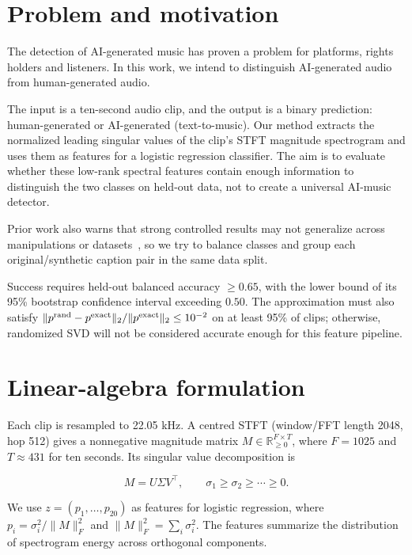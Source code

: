 \documentclass[11pt,a4paper]{article}
\theoremstyle{plain}
\theoremstyle{definition}
\theoremstyle{remark}
\begin{document}
\section{Problem and motivation}
\label{sec:problem}
The detection of AI-generated music has proven a problem
for platforms, rights holders and listeners. In this work,
we intend to distinguish AI-generated audio from human-generated audio.

The input is a ten-second audio clip, and the output is a binary prediction:
human-generated or AI-generated (text-to-music). Our method extracts the
normalized leading singular values of the clip's STFT magnitude spectrogram
and uses them as features for a logistic regression classifier.
The aim is to evaluate whether these low-rank spectral features contain
enough information to distinguish the two classes on held-out data,
not to create a universal AI-music detector.

Prior work also warns that
strong controlled results may not generalize across manipulations
or datasets~\cite{Afchar,LiBench}, so we try to balance classes
and group each original/synthetic caption pair in the same data split.

Success requires held-out balanced accuracy $\geq0.65$, with the lower bound
of its 95\% bootstrap confidence interval exceeding $0.50$.
The approximation must also satisfy
$\|p^{\rm rand}-p^{\rm exact}\|_2/\|p^{\rm exact}\|_2\leq10^{-2}$ on at least
95\% of clips; otherwise, randomized SVD will not be considered accurate
enough for this feature pipeline.

\section{Linear-algebra formulation}
\label{sec:formulation}

Each clip is resampled to 22.05 kHz. A centred STFT
(window/FFT length 2048, hop 512) gives a nonnegative
magnitude matrix $M\in\mathbb{R}_{\geq0}^{F\times T}$,
where $F=1025$ and $T\approx431$ for ten seconds.
Its singular value decomposition is

\begin{equation}\label{eq:svd}
  M=U\Sigma V^\top,\qquad \sigma_1\geq\sigma_2\geq\cdots\geq0.
\end{equation}

We use $z=(p_1,\ldots,p_{20})$ as features for logistic regression,
where $p_i=\sigma_i^2/\|M\|_F^2$ and $\|M\|_F^2=\sum_i\sigma_i^2$.
The features summarize the distribution of spectrogram energy across
orthogonal components.
\end{document}
